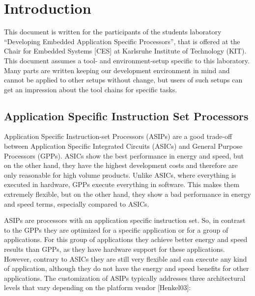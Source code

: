 \documentclass[
]{article}
\author{}
\date{}
\begin{document}
\hypertarget{introduction}{%
\section{Introduction}\label{introduction}}

This document is written for the participants of the students laboratory
``Developing Embedded Application Specific Processors'', that is offered
at the Chair for Embedded Systems {[}CES{]} at Karlsruhe Institute of
Technology (KIT). This document assumes a tool- and environment-setup
specific to this laboratory. Many parts are written keeping our
development environment in mind and cannot be applied to other setups
without change, but users of such setups can get an impression about the
tool chains for specific tasks.

\hypertarget{application-specific-instruction-set-processors}{%
\subsection{Application Specific Instruction Set
Processors}\label{application-specific-instruction-set-processors}}

Application Specific Instruction-set Processors (ASIPs) are a good
trade-off between Application Specific Integrated Circuits (ASICs) and
General Purpose Processors (GPPs). ASICs show the best performance in
energy and speed, but on the other hand, they have the highest
development costs and therefore are only reasonable for high volume
products. Unlike ASICs, where everything is executed in hardware, GPPs
execute everything in software. This makes them extremely flexible, but
on the other hand, they show a bad performance in energy and speed
terms, especially compared to ASICs.

ASIPs are processors with an application specific instruction set. So,
in contrast to the GPPs they are optimized for a specific application or
for a group of applications. For this group of applications they achieve
better energy and speed results than GPPs, as they have hardware support
for these applications. However, contrary to ASICs they are still very
flexible and can execute any kind of application, although they do not
have the energy and speed benefits for other applications. The
customization of ASIPs typically addresses three architectural levels
that vary depending on the platform vendor {[}Henkel03{]}:
\end{document}
